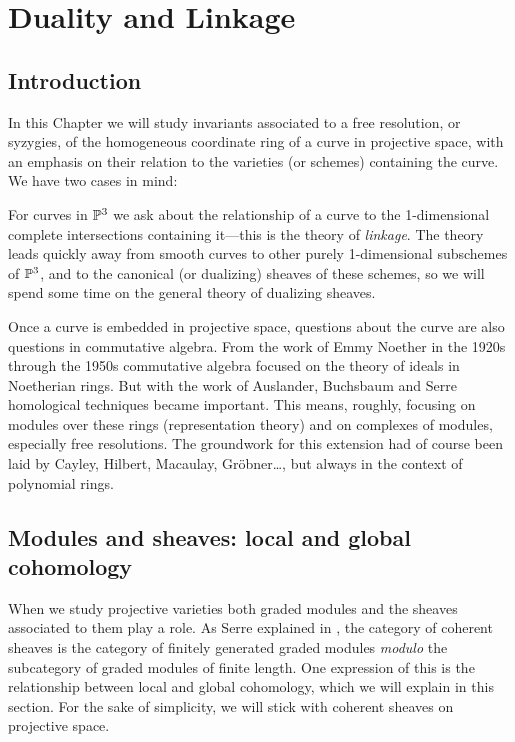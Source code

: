 

\chapter{Duality and Linkage}
\label{DualityChapter}

\def\length{{\rm length}}
\section{Introduction} 
In this Chapter we will study  invariants associated to a free resolution, or syzygies, of the homogeneous coordinate ring of a curve in projective space, with an emphasis on their relation to the varieties (or schemes) containing the curve. We have two cases in mind:

For curves in $\PP^{3}$ we ask about the relationship of a curve to the 1-dimensional complete intersections containing it---this is the theory of \emph{linkage}. The theory leads quickly away from smooth curves to other purely 1-dimensional subschemes of $\PP^{3}$, and to the canonical (or dualizing) sheaves of these schemes, so we will spend some time on the general theory of dualizing sheaves.

Once a curve is embedded in projective space, questions about the curve are also questions in commutative algebra. From the work of Emmy Noether in the 1920s through the 1950s commutative algebra focused on the theory of ideals in Noetherian rings. But with the work of Auslander, Buchsbaum and Serre homological techniques became important. This means, roughly, focusing on modules over these rings (representation theory) and on complexes of modules, especially free resolutions. The groundwork for this extension had of course been laid by Cayley, Hilbert, Macaulay, Gr\"obner\dots, but always in the context of polynomial rings. 

\section{Modules and sheaves: local and global cohomology}

When we study projective varieties both graded modules and the sheaves associated to them play a role. As Serre explained in \cite{FAC}, the category of coherent sheaves is the category of finitely generated graded modules \emph{modulo} the subcategory of graded modules of finite length. One expression of this is the relationship between local and global cohomology, which we will explain in this section. For the sake of simplicity, we will stick with coherent sheaves on projective space.


